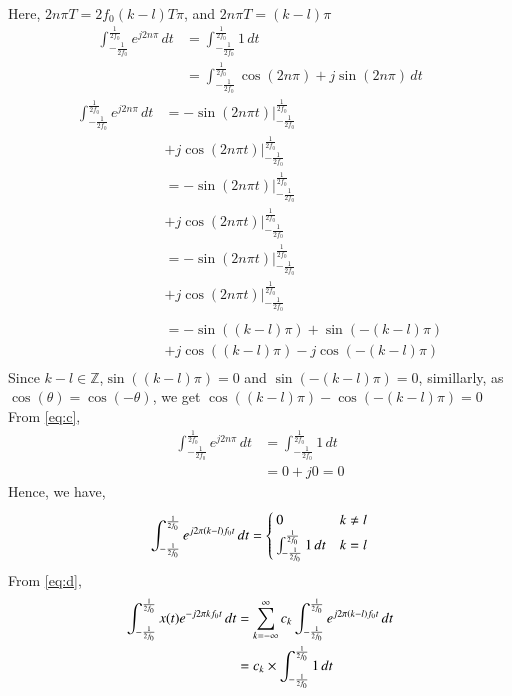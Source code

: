 \documentclass[journal,12pt,twocolumn]{IEEEtran}
\renewcommand\thesection{\arabic{section}}
\begin{document}
\begin{enumerate}[label=\thesection.\arabic*,ref=\thesection.\theenumi]
\begin{align}
\end{align}
Here, $2n\pi T=2f_0(k-l)T\pi$, and $2n\pi T=(k-l)\pi$
\begin{align}
\int_{-\frac{1}{2f_0}}^{\frac{1}{2f_0}}e^{j2n\pi}\,dt&=\int_{-\frac{1}{2f_0}}^{\frac{1}{2f_0}}1\,dt\\&=\int_{-\frac{1}{2f_0}}^{\frac{1}{2f_0}}\cos(2n\pi)+j\sin(2n\pi) \,dt
\end{align}
\begin{align}
\int_{-\frac{1}{2f_0}}^{\frac{1}{2f_0}}e^{j2n\pi}\,dt&=
-\sin(2n\pi t)\bigg|_{-\frac{1}{2f_0}}^{\frac{1}{2f_0}}\\&+j\cos(2n\pi t)\bigg|_{-\frac{1}{2f_0}}^{\frac{1}{2f_0}}\\
&=-\sin(2n\pi t)\bigg|_{-\frac{1}{2f_0}}^{\frac{1}{2f_0}}\\&+j\cos(2n\pi t)\bigg|_{-\frac{1}{2f_0}}^{\frac{1}{2f_0}}\\
&=-\sin(2n\pi t)\bigg|_{-\frac{1}{2f_0}}^{\frac{1}{2f_0}}\\&+j\cos(2n\pi t)\bigg|_{-\frac{1}{2f_0}}^{\frac{1}{2f_0}}\\
\label{eq:c}\\
&=-\sin((k-l)\pi)+\sin(-(k-l)\pi)\\&+j\cos((k-l)\pi)-j\cos(-(k-l)\pi)\\
\end{align}
Since $k-l \in \mathbb{Z}$,$\sin((k-l)\pi)=0$ and $\sin(-(k-l)\pi)=0$, simillarly, as $\cos(\theta)=\cos(-\theta)$, we get $\cos((k-l)\pi)-\cos(-(k-l)\pi)=0$\\
From \eqref{eq:c},
\begin{align}
	\int_{-\frac{1}{2f_0}}^{\frac{1}{2f_0}}e^{j2n\pi}\,dt&=\int_{-\frac{1}{2f_0}}^{\frac{1}{2f_0}}1\,dt\\&=0+j0=0
\end{align}
Hence, we have,
    \begin{align}
\int_{-\frac{1}{2f_0}}^{\frac{1}{2f_0}}e^{j2\pi \left(k-l\right)f_0 t}\,dt=
         \begin{cases}
0 & k\neq l
\\
 \int_{-\frac{1}{2f_0}}^{\frac{1}{2f_0}}1\,dt& k=l
\end{cases}
    \end{align}
From \eqref{eq:d},
    \begin{align}
    	\int_{-\frac{1}{2f_0}}^{\frac{1}{2f_0}}x(t)e^{-j2\pi kf_0 t}\, dt&=\sum_{k = -\infty}^{\infty}c_k\int_{-\frac{1}{2f_0}}^{\frac{1}{2f_0}}e^{j2\pi \brak{k-l}f_0 t}\,dt\\
    	&=c_k \times \int_{-\frac{1}{2f_0}}^{\frac{1}{2f_0}}1\,dt

\end{align}
\end{enumerate}
\end{document}
